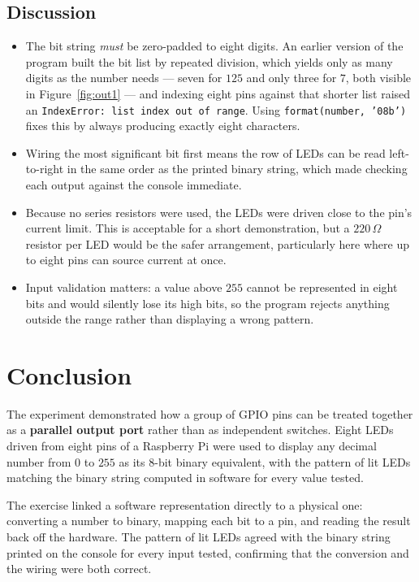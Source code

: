 \documentclass[10pt,a4paper]{article}
\begin{document}
\subsection*{Discussion}
\label{sec:discussion}
\begin{itemize}
  \item The bit string \emph{must} be zero-padded to eight digits. An earlier version of
        the program built the bit list by repeated division, which yields only as many
        digits as the number needs --- seven for $125$ and only three for $7$, both
        visible in Figure~\ref{fig:out1} --- and indexing eight pins against that shorter list
        raised an \texttt{IndexError: list index out of range}. Using
        \texttt{format(number, '08b')} fixes this by always producing exactly eight
        characters.
  \item Wiring the most significant bit first means the row of LEDs can be read
        left-to-right in the same order as the printed binary string, which made
        checking each output against the console immediate.
  \item Because no series resistors were used, the LEDs were driven close to the pin's
        current limit. This is acceptable for a short demonstration, but a
        $220\,\Omega$ resistor per LED would be the safer arrangement, particularly
        here where up to eight pins can source current at once.
  \item Input validation matters: a value above $255$ cannot be represented in eight
        bits and would silently lose its high bits, so the program rejects anything
        outside the range rather than displaying a wrong pattern.
\end{itemize}

\section{Conclusion}

The experiment demonstrated how a group of GPIO pins can be treated together as a
\textbf{parallel output port} rather than as independent switches. Eight LEDs driven
from eight pins of a Raspberry Pi were used to display any decimal number from $0$ to
$255$ as its 8-bit binary equivalent, with the pattern of lit LEDs matching the binary
string computed in software for every value tested.

The exercise linked a software representation directly to a physical one: converting a
number to binary, mapping each bit to a pin, and reading the result back off the
hardware. The pattern of lit LEDs agreed with the binary string printed on the console
for every input tested, confirming that the conversion and the wiring were both
correct.
\end{document}
